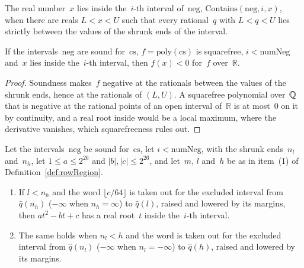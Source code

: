 \begin{definition}\label{def:NegativeIntervals.Contains}
  \leanok
  The real number~$x$ lies inside the~$i$-th interval of~$\mathrm{neg}$,
  $\mathrm{Contains}(\mathrm{neg}, i, x)$, when there are reals $L < x < U$ such that every
  rational~$q$ with $L < q < U$ lies strictly between the values of the shrunk ends of the
  interval.
\end{definition}

\begin{lemma}\label{lem:NegativeIntervals.Sound.eval_map_neg_of_contains}
  \leanok
  If the intervals~$\mathrm{neg}$ are sound for~$\mathrm{cs}$, $f = \mathrm{poly}(\mathrm{cs})$ is
  squarefree, $i < \mathrm{numNeg}$ and~$x$ lies inside the~$i$-th interval, then $f(x) < 0$ for~$f$
  over~$\mathbb{R}$.
\end{lemma}

\begin{proof}
  \leanok
  Soundness makes~$f$ negative at the rationals between the values of the shrunk ends, hence at the
  rationals of $(L, U)$. A squarefree polynomial over~$\mathbb{Q}$ that is negative at the rational points
  of an open interval of~$\mathbb{R}$ is at most~$0$ on it by continuity, and a real root inside
  would be a local maximum, where the derivative vanishes, which squarefreeness rules out.
\end{proof}

\begin{lemma}\label{lem:NegativeIntervals.Sound.exists_contains_of_regionExcludes_from}
  \leanok
  Let the intervals~$\mathrm{neg}$ be sound for~$\mathrm{cs}$, let $i < \mathrm{numNeg}$, with the
  shrunk ends~$n_l$ and~$n_h$, let $1 \le a \le 2^{26}$ and $|b|, |c| \le 2^{26}$, and let~$m$, $l$
  and~$h$ be as in item~(1) of Definition~\ref{def:rowRegion}.
  \begin{enumerate}
    \item If $l < n_h$ and the word $\lfloor c/64 \rfloor$ is taken out for the excluded interval
      from $\widehat{q}(n_h)$ ($-\infty$ when $n_h = \infty$) to $\widehat{q}(l)$, raised and
      lowered by its margins, then $a t^2 - b t + c$ has a real root~$t$ inside the~$i$-th interval.
    \item The same holds when $n_l < h$ and the word is taken out for the excluded interval from
      $\widehat{q}(n_l)$ ($-\infty$ when $n_l = -\infty$) to $\widehat{q}(h)$, raised and lowered by
      its margins.
  \end{enumerate}
\end{lemma}

